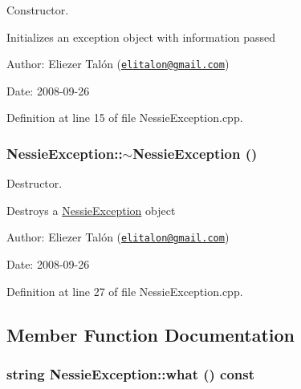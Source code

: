 Constructor. 

Initializes an exception object with information passed

\begin{Desc}
\item[Author:]Eliezer Talón (\href{mailto:elitalon@gmail.com}{\tt elitalon@gmail.com}) \end{Desc}
\begin{Desc}
\item[Date:]2008-09-26 \end{Desc}


Definition at line 15 of file NessieException.cpp.\hypertarget{class_nessie_exception_19f44d2725dd53e2f10505a88e5773f2}{
\subsubsection[$\sim$NessieException]{\setlength{\rightskip}{0pt plus 5cm}NessieException::$\sim$NessieException ()}}
\label{class_nessie_exception_19f44d2725dd53e2f10505a88e5773f2}


Destructor. 

Destroys a \hyperlink{class_nessie_exception}{NessieException} object

\begin{Desc}
\item[Author:]Eliezer Talón (\href{mailto:elitalon@gmail.com}{\tt elitalon@gmail.com}) \end{Desc}
\begin{Desc}
\item[Date:]2008-09-26 \end{Desc}


Definition at line 27 of file NessieException.cpp.

\subsection{Member Function Documentation}
\hypertarget{class_nessie_exception_ec94145f2fd5febb7ca0b7587652b777}{
\subsubsection[what]{\setlength{\rightskip}{0pt plus 5cm}string NessieException::what () const}}
\label{class_nessie_exception_ec94145f2fd5febb7ca0b7587652b777}


